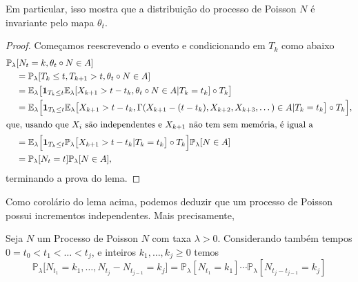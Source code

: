 \begin{topics}
Em particular, isso mostra que a distribuição do processo de Poisson $N$ é invariante pelo mapa $\theta_t$.

\begin{proof}
  Começamos reescrevendo o evento e condicionando em $T_k$ como abaixo
  \begin{equation*}
    \begin{split}
      \mathbb{P}_\lambda & [N_t = k, \theta_t \circ N \in A] \\
      & = \mathbb{P}_\lambda[T_k \leq t, T_{k + 1} > t , \theta_t \circ N \in A] \\
      & = \mathbb{E}_\lambda \big[ {\bf 1}_{T_k \leq t} \mathbb{E}_\lambda [X_{k + 1} > t - t_k, \theta_t \circ N \in A | T_k = t_k ] \circ T_k \big] \\
      & = \mathbb{E}_\lambda \Big[ {\bf 1}_{T_k \leq t} \mathbb{E}_\lambda \big[X_{k + 1} > t - t_k, \Gamma (X_{k + 1} - (t - t_k), X_{k + 2}, X_{k + 3}, \dots ) \in A | T_k = t_k \big] \circ T_k \Big], \\
      \intertext{que, usando que $X_i$ são independentes e $X_{k + 1}$ não tem sem memória, é igual a}
      & = \mathbb{E}_\lambda \Big[ {\bf 1}_{T_k \leq t} \mathbb{P}_\lambda \big[X_{k + 1} > t - t_k | T_k = t_k \big] \circ T_k \Big] \mathbb{P}_\lambda [N \in A] \\
      & = \mathbb{P}_\lambda[ N_t = t ] \mathbb{P}_\lambda [N \in A],
    \end{split}
  \end{equation*}
  terminando a prova do lema.
\end{proof}

Como corolário do lema acima, podemos deduzir que um processo de Poisson possui incrementos independentes.
Mais precisamente,

\begin{corollary}
  Seja $N$ um Processo de Poisson $N$ com taxa $\lambda > 0$.
  Considerando também tempos $0 = t_0 < t_1 < \dots < t_j$, e inteiros $k_1, \dots, k_j \geq 0$ temos
  \begin{equation*}
    \mathbb{P}_\lambda \big[ N_{t_1} = k_1, \dots, N_{t_j} - N_{t_{j - 1}} = k_j \big] = \mathbb{P}_\lambda [N_{t_1} = k_1] \cdots \mathbb{P}_\lambda [N_{t_j - t_{j - 1}} = k_j]
  \end{equation*}
\end{corollary}


\end{topics}
